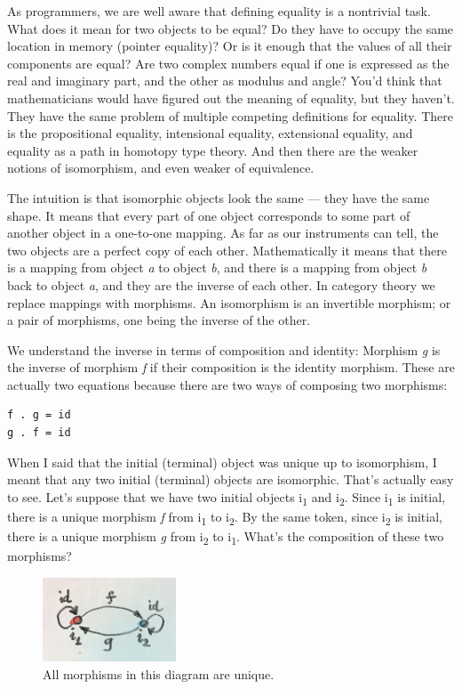 As programmers, we are well aware that defining equality is a nontrivial
task. What does it mean for two objects to be equal? Do they have to
occupy the same location in memory (pointer equality)? Or is it enough
that the values of all their components are equal? Are two complex
numbers equal if one is expressed as the real and imaginary part, and
the other as modulus and angle? You'd think that mathematicians would
have figured out the meaning of equality, but they haven't. They have
the same problem of multiple competing definitions for equality. There
is the propositional equality, intensional equality, extensional
equality, and equality as a path in homotopy type theory. And then there
are the weaker notions of isomorphism, and even weaker of equivalence.

The intuition is that isomorphic objects look the same --- they have the
same shape. It means that every part of one object corresponds to some
part of another object in a one-to-one mapping. As far as our
instruments can tell, the two objects are a perfect copy of each other.
Mathematically it means that there is a mapping from object \emph{a} to
object \emph{b}, and there is a mapping from object \emph{b} back to
object \emph{a}, and they are the inverse of each other. In category
theory we replace mappings with morphisms. An isomorphism is an
invertible morphism; or a pair of morphisms, one being the inverse of
the other.

We understand the inverse in terms of composition and identity: Morphism
\emph{g} is the inverse of morphism \emph{f} if their composition is the
identity morphism. These are actually two equations because there are
two ways of composing two morphisms:

\begin{verbatim}
f . g = id
g . f = id
\end{verbatim}

When I said that the initial (terminal) object was unique up to
isomorphism, I meant that any two initial (terminal) objects are
isomorphic. That's actually easy to see. Let's suppose that we have two
initial objects i\textsubscript{1} and i\textsubscript{2}. Since
i\textsubscript{1} is initial, there is a unique morphism \emph{f} from
i\textsubscript{1} to i\textsubscript{2}. By the same token, since
i\textsubscript{2} is initial, there is a unique morphism \emph{g} from
i\textsubscript{2} to i\textsubscript{1}. What's the composition of
these two morphisms?

\begin{figure}
  \centering
          \includegraphics[width=1.56250in]{images/uniqueness.jpg}
      \captionsetup{labelformat=empty,font=scriptsize}
      \caption{All morphisms in this diagram are unique.}
\end{figure}

